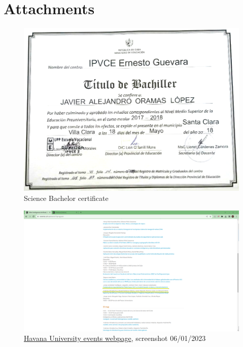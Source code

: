 \documentclass{article}
\begin{document}
\section*{Attachments}
\begin{figure}[h]
    \includegraphics[width=\textwidth]{images/bachelor.png}
    \caption{Science Bachelor certificate}
    \label{sec:bachelor}
\end{figure}

\begin{figure}[h]
    \includegraphics[width=\textwidth]{images/ai_workshop.png}
    \caption{\href{https://eventos.uh.cu/event/7/program}{Havana University events webpage}, screenshot 06/01/2023}
    \label{sec:workshop}
\end{figure}
\end{document}
